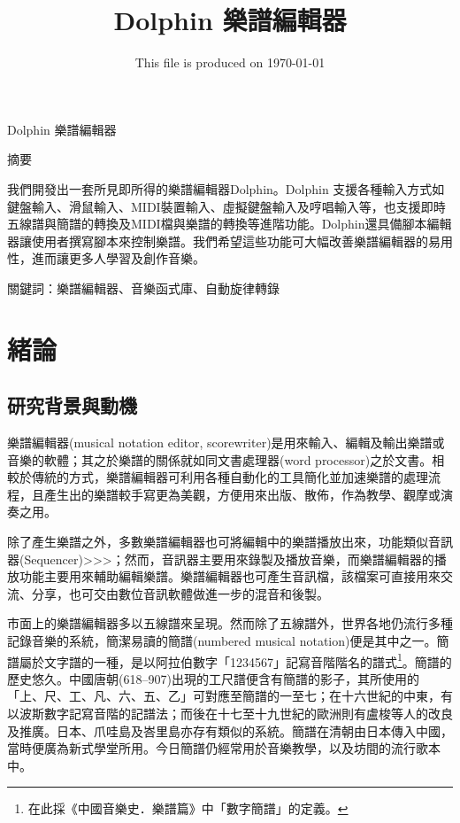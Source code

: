 \documentclass[12pt,a4paper,oneside]{report}
\begin{document}
\title{Dolphin 樂譜編輯器}
\date{This file is produced on \today}
\maketitle

\begin{center}
Dolphin 樂譜編輯器

摘要
\end{center}

我們開發出一套所見即所得的樂譜編輯器Dolphin。Dolphin 支援各種輸入方式如鍵盤輸入、滑鼠輸入、MIDI裝置輸入、虛擬鍵盤輸入及哼唱輸入等，也支援即時五線譜與簡譜的轉換及MIDI檔與樂譜的轉換等進階功能。Dolphin還具備腳本編輯器讓使用者撰寫腳本來控制樂譜。我們希望這些功能可大幅改善樂譜編輯器的易用性，進而讓更多人學習及創作音樂。

關鍵詞：樂譜編輯器、音樂函式庫、自動旋律轉錄


\tableofcontents

\chapter{緒論}
\section{研究背景與動機}


樂譜編輯器(musical notation editor, scorewriter)是用來輸入、編輯及輸出樂譜或音樂的軟體；其之於樂譜的關係就如同文書處理器(word processor)之於文書。相較於傳統的方式，樂譜編輯器可利用各種自動化的工具簡化並加速樂譜的處理流程，且產生出的樂譜較手寫更為美觀，方便用來出版、散佈，作為教學、觀摩或演奏之用。

除了產生樂譜之外，多數樂譜編輯器也可將編輯中的樂譜播放出來，功能類似音訊器(Sequencer)>>>；然而，音訊器主要用來錄製及播放音樂，而樂譜編輯器的播放功能主要用來輔助編輯樂譜。樂譜編輯器也可產生音訊檔，該檔案可直接用來交流、分享，也可交由數位音訊軟體做進一步的混音和後製。

市面上的樂譜編輯器多以五線譜來呈現。然而除了五線譜外，世界各地仍流行多種記錄音樂的系統，簡潔易讀的簡譜(numbered musical notation)便是其中之一。簡譜屬於文字譜的一種\cite{chinaEncyclopedia}，是以阿拉伯數字「1234567」記寫音階階名的譜式\footnote{在此採《中國音樂史．樂譜篇》中「數字簡譜」\cite{chinaMusicHistory}的定義。}。簡譜的歷史悠久。中國唐朝(618–907)出現的工尺譜便含有簡譜的影子，其所使用的「上、尺、工、凡、六、五、乙」可對應至簡譜的一至七\cite{wiki}；在十六世紀的中東，有以波斯數字記寫音階的記譜法；而後在十七至十九世紀的歐洲則有盧梭等人的改良及推廣。日本、爪哇島及峇里島亦存有類似的系統\cite{britannica}。簡譜在清朝由日本傳入中國，當時便廣為新式學堂所用。今日簡譜仍經常用於音樂教學，以及坊間的流行歌本中。
\end{document}
